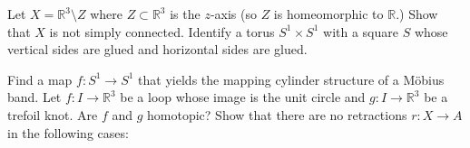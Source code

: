 \documentclass{exam}
\begin{document}
\centering
{}
\vspace{1em}
\begin{questions}
    \question
        Let $X=\mathbb{R}^3\setminus Z$ where $Z\subset\mathbb{R}^3$ is the $z$-axis (so $Z$ is homeomorphic to $\mathbb{R}$.) 
        Show that $X$ is not simply connected.
    \question
        Identify a torus $S^1 \times S^1$ with a square $S$ whose vertical sides are glued and horizontal sides are glued.
    \question
        Find a map $f: S^1 \to S^1$ that yields the mapping cylinder structure of a Möbius band.
    \question
        Let $f: I\to\mathbb{R}^3$ be a loop whose image is the unit circle and $g: I \to \mathbb{R}^3$ be a trefoil knot. Are $f$ and $g$ homotopic?
    \question
        Show that there are no retractions $r: X \to A$ in the following cases:
    \question
        \begin{parts}

\end{parts}
\end{questions}
\end{document}
